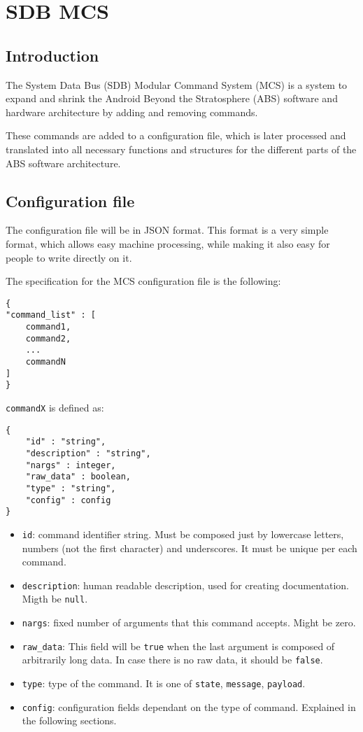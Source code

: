 \documentclass[12pt,a4paper]{report}
\begin{document}
\section*{SDB MCS}

\subsection*{Introduction}
The System Data Bus (SDB) Modular Command System (MCS) is a system to expand and shrink the Android Beyond the Stratosphere (ABS) software and hardware architecture by adding and removing commands.

These commands are added to a configuration file, which is later processed and translated into all necessary functions and structures for the different parts of the ABS software architecture.

\subsection*{Configuration file}
The configuration file will be in JSON format. This format is a very simple format, which allows easy machine processing, while making it also easy for people to write directly on it.

The specification for the MCS configuration file is the following:

\begin{lstlisting}
{
"command_list" : [
    command1,
    command2,
    ...
    commandN
]
}
\end{lstlisting}

\texttt{commandX} is defined as:
\begin{lstlisting}
{
    "id" : "string",
    "description" : "string",
    "nargs" : integer,
    "raw_data" : boolean,
    "type" : "string",
    "config" : config
}
\end{lstlisting}

\begin{itemize}
\item \texttt{id}: command identifier string. Must be composed just by lowercase letters, numbers (not the first character) and underscores. It must be unique per each command.
\item \texttt{description}: human readable description, used for creating documentation. Migth be \texttt{null}.
\item \texttt{nargs}: fixed number of arguments that this command accepts. Might be zero.
\item \texttt{raw\_data}: This field will be \texttt{true} when the last argument is composed of arbitrarily long data. In case there is no raw data, it should be \texttt{false}.
\item \texttt{type}: type of the command. It is one of \texttt{state}, \texttt{message}, \texttt{payload}.
\item \texttt{config}: configuration fields dependant on the type of command. Explained in the following sections.
\end{itemize}
\end{document}
